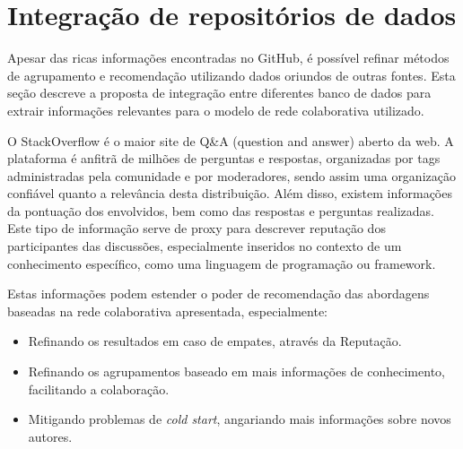 \documentclass[a4paper,12pt]{monografia}
\theoremstyle{plain}
\theoremstyle{definition}
\theoremstyle{remark}
\begin{document}
\begin{table}[!h]
\centering
{}
\caption{Descrição dos Respositórios Selecionados}
\label{tab:repos}
\end{table}

\section{Integração de repositórios de dados}

Apesar das ricas informações encontradas no GitHub, é possível refinar métodos de agrupamento e recomendação utilizando dados oriundos de outras fontes. Esta seção descreve a proposta de integração entre diferentes banco de dados para extrair informações relevantes para o modelo de rede colaborativa utilizado.

O StackOverflow é o maior site de Q&A (question and answer) aberto da web. A plataforma é anfitrã de milhões de perguntas e respostas, organizadas por tags administradas pela comunidade e por moderadores, sendo assim uma organização confiável quanto a relevância desta distribuição. Além disso, existem informações da pontuação dos envolvidos, bem como das respostas e perguntas realizadas. Este tipo de informação serve de proxy para descrever reputação dos participantes das discussões, especialmente inseridos no contexto de um conhecimento específico, como uma linguagem de programação ou framework.

Estas informações podem estender o poder de recomendação das abordagens baseadas na rede colaborativa apresentada, especialmente:


\begin{itemize}
  \item Refinando os resultados em caso de empates, através da Reputação.

  \item Refinando os agrupamentos baseado em mais informações de conhecimento, facilitando a colaboração.

  \item Mitigando problemas de \textit{cold start}, angariando mais informações sobre novos autores.
\end{itemize}
\end{document}
